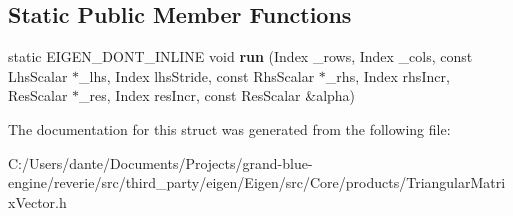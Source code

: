\subsection*{Static Public Member Functions}
\begin{DoxyCompactItemize}
\item 
\mbox{\label{struct_eigen_1_1internal_1_1triangular__matrix__vector__product_3_01_index_00_01_mode_00_01_lhs_ba3b9cdc80cdaeff44c1d1ed32cbe15b_aafcdc880dbd90da1abd4182d80257e46}} 
static E\+I\+G\+E\+N\+\_\+\+D\+O\+N\+T\+\_\+\+I\+N\+L\+I\+NE void {\bfseries run} (Index \+\_\+rows, Index \+\_\+cols, const Lhs\+Scalar $\ast$\+\_\+lhs, Index lhs\+Stride, const Rhs\+Scalar $\ast$\+\_\+rhs, Index rhs\+Incr, Res\+Scalar $\ast$\+\_\+res, Index res\+Incr, const Res\+Scalar \&alpha)
\end{DoxyCompactItemize}


The documentation for this struct was generated from the following file\+:\begin{DoxyCompactItemize}
\item 
C\+:/\+Users/dante/\+Documents/\+Projects/grand-\/blue-\/engine/reverie/src/third\+\_\+party/eigen/\+Eigen/src/\+Core/products/Triangular\+Matrix\+Vector.\+h\end{DoxyCompactItemize}

